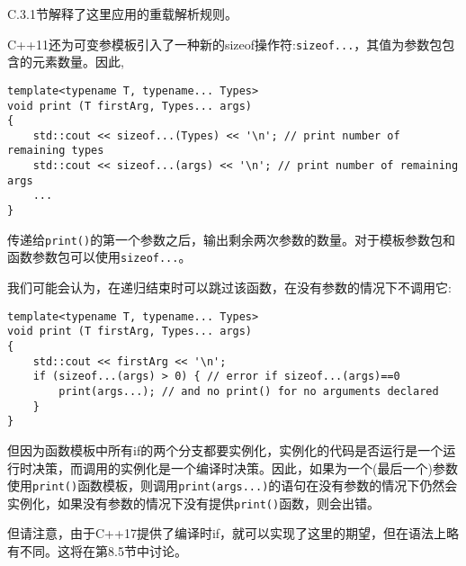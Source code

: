 C.3.1节解释了这里应用的重载解析规则。


C++11还为可变参模板引入了一种新的sizeof操作符:\texttt{sizeof...}，其值为参数包包含的元素数量。因此,

\begin{lstlisting}[style=styleCXX]
template<typename T, typename... Types>
void print (T firstArg, Types... args)
{
	std::cout << sizeof...(Types) << '\n'; // print number of remaining types
	std::cout << sizeof...(args) << '\n'; // print number of remaining args
	...
}
\end{lstlisting}

传递给\texttt{print()}的第一个参数之后，输出剩余两次参数的数量。对于模板参数包和函数参数包可以使用\texttt{sizeof...}。

我们可能会认为，在递归结束时可以跳过该函数，在没有参数的情况下不调用它:

\begin{lstlisting}[style=styleCXX]
template<typename T, typename... Types>
void print (T firstArg, Types... args)
{
	std::cout << firstArg << '\n';
	if (sizeof...(args) > 0) { // error if sizeof...(args)==0
		print(args...); // and no print() for no arguments declared
	}
}
\end{lstlisting}

但因为函数模板中所有if的两个分支都要实例化，实例化的代码是否运行是一个运行时决策，而调用的实例化是一个编译时决策。因此，如果为一个(最后一个)参数使用\texttt{print()}函数模板，则调用\texttt{print(args...)}的语句在没有参数的情况下仍然会实例化，如果没有参数的情况下没有提供\texttt{print()}函数，则会出错。

但请注意，由于C++17提供了编译时if，就可以实现了这里的期望，但在语法上略有不同。这将在第8.5节中讨论。

























